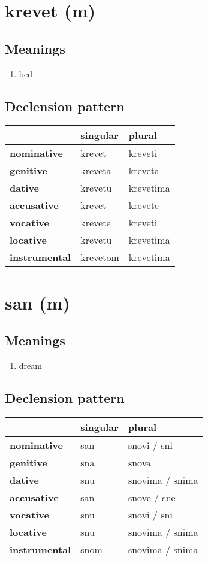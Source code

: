 \filbreak
\section{krevet (m)}
\subsection*{Meanings}
\begin{enumerate}
\item bed
\end{enumerate}
\subsection*{Declension pattern}
\begin{tabularx}{\linewidth}{Xll}
\toprule
{} &  singular &     plural \\
\midrule
\textbf{nominative  } &    krevet &    kreveti \\
\textbf{genitive    } &   kreveta &    kreveta \\
\textbf{dative      } &   krevetu &  krevetima \\
\textbf{accusative  } &    krevet &    krevete \\
\textbf{vocative    } &   krevete &    kreveti \\
\textbf{locative    } &   krevetu &  krevetima \\
\textbf{instrumental} &  krevetom &  krevetima \\
\bottomrule
\end{tabularx}

\filbreak
\section{san (m)}
\subsection*{Meanings}
\begin{enumerate}
\item dream
\end{enumerate}
\subsection*{Declension pattern}
\begin{tabularx}{\linewidth}{Xll}
\toprule
{} & singular &           plural \\
\midrule
\textbf{nominative  } &      san &      snovi / sni \\
\textbf{genitive    } &      sna &            snova \\
\textbf{dative      } &      snu &  snovima / snima \\
\textbf{accusative  } &      san &      snove / sne \\
\textbf{vocative    } &      snu &      snovi / sni \\
\textbf{locative    } &      snu &  snovima / snima \\
\textbf{instrumental} &     snom &  snovima / snima \\
\bottomrule
\end{tabularx}


